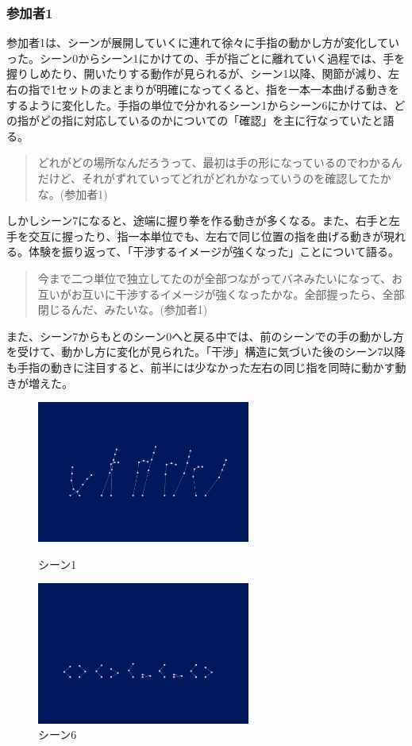 \subsubsection*{参加者1}
参加者1は、シーンが展開していくに連れて徐々に手指の動かし方が変化していった。シーン0からシーン1にかけての、手が指ごとに離れていく過程では、手を握りしめたり、開いたりする動作が見られるが、シーン1以降、関節が減り、左右の指で1セットのまとまりが明確になってくると、指を一本一本曲げる動きをするように変化した。手指の単位で分かれるシーン1からシーン6にかけては、どの指がどの指に対応しているのかについての「確認」を主に行なっていたと語る。
\begin{quote}
  どれがどの場所なんだろうって、最初は手の形になっているのでわかるんだけど、それがずれていってどれがどれかなっていうのを確認してたかな。(参加者1)
\end{quote}
しかしシーン7になると、途端に握り拳を作る動きが多くなる。また、右手と左手を交互に握ったり、指一本単位でも、左右で同じ位置の指を曲げる動きが現れる。体験を振り返って、「干渉するイメージが強くなった」ことについて語る。
\begin{quote}
  今まで二つ単位で独立してたのが全部つながってバネみたいになって、お互いがお互いに干渉するイメージが強くなったかな。全部握ったら、全部閉じるんだ、みたいな。(参加者1)
\end{quote}

また、シーン7からもとのシーン0へと戻る中では、前のシーンでの手の動かし方を受けて、動かし方に変化が見られた。「干渉」構造に気づいた後のシーン7以降も手指の動きに注目すると、前半には少なかった左右の同じ指を同時に動かす動きが増えた。

\begin{figure}[htbp]
  \begin{minipage}[b]{0.5\linewidth}
    \centering
    \includegraphics[keepaspectratio, width=7cm]{img/scene1.png}
    \caption{シーン1}
    \label{fig:scene1}
  \end{minipage}
  \begin{minipage}[b]{0.5\linewidth}
    \centering
    \includegraphics[keepaspectratio, width=7cm]{img/scene6.png}
    \caption{シーン6}
    \label{fig:scene6}
  \end{minipage}
\end{figure}

